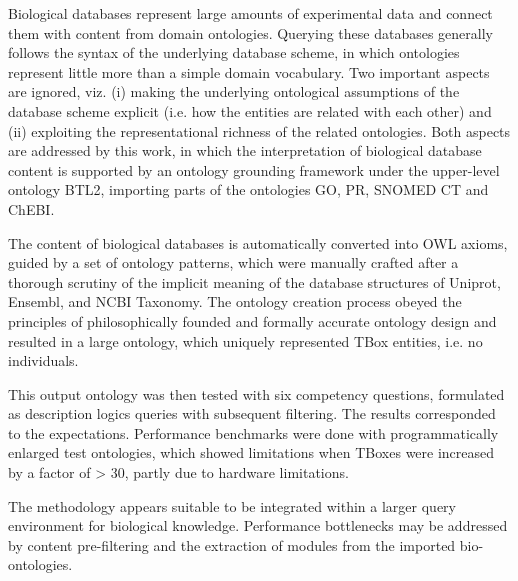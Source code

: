 Biological databases represent large amounts of experimental data and connect them with content from domain ontologies. Querying these databases generally follows the syntax of the underlying database scheme, in which ontologies represent little more than a simple domain vocabulary. Two important aspects are ignored, viz. (i) making the underlying ontological assumptions of the database scheme explicit (i.e. how the entities are related with each other) and (ii) exploiting the representational richness of the related ontologies. 
Both aspects are addressed by this work, in which the interpretation of biological database content is supported by an ontology grounding framework under the upper-level ontology BTL2, importing parts of the ontologies GO, PR, SNOMED CT and ChEBI. 

The content of biological databases is automatically converted into OWL axioms, guided by a set of ontology patterns, which were manually crafted after a thorough scrutiny of the implicit meaning of the database structures of Uniprot, Ensembl, 
and NCBI Taxonomy. The ontology creation process obeyed the principles of philosophically founded and formally accurate ontology design and resulted in a large ontology, which uniquely represented TBox entities, i.e. no individuals. 

This output ontology was then tested with six competency questions, formulated as description logics queries with subsequent filtering. The results corresponded to the expectations. Performance benchmarks were done with programmatically enlarged test ontologies, which showed limitations when TBoxes were increased by a factor of  > 30, partly due to hardware limitations.

The methodology appears suitable to be integrated within a larger query environment for biological knowledge. Performance bottlenecks may be addressed by content pre-filtering and the extraction of modules from the imported bio-ontologies.   

 


